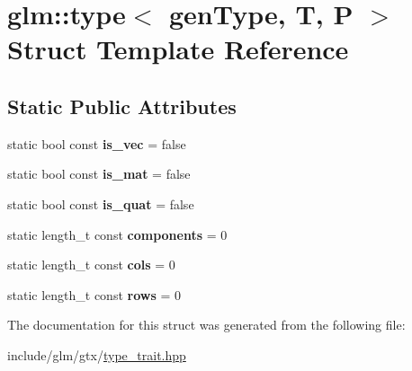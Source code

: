 \hypertarget{structglm_1_1type}{}\section{glm\+:\+:type$<$ gen\+Type, T, P $>$ Struct Template Reference}
\label{structglm_1_1type}
\subsection*{Static Public Attributes}
\begin{DoxyCompactItemize}
\item 
\mbox{\label{structglm_1_1type_a6fdf149b7bcaa9a1d82e29628b7c65ee}} 
static bool const {\bfseries is\+\_\+vec} = false
\item 
\mbox{\label{structglm_1_1type_a26e1d1fef808e586b3ed70c4b182abdf}} 
static bool const {\bfseries is\+\_\+mat} = false
\item 
\mbox{\label{structglm_1_1type_a183d0db2aaef58410b9042663d74e487}} 
static bool const {\bfseries is\+\_\+quat} = false
\item 
\mbox{\label{structglm_1_1type_ab7c161596abb92f6e6c6a19370d81e40}} 
static length\+\_\+t const {\bfseries components} = 0
\item 
\mbox{\label{structglm_1_1type_abe7de2b1bd7b23a03a5da5ef5e66b7f7}} 
static length\+\_\+t const {\bfseries cols} = 0
\item 
\mbox{\label{structglm_1_1type_a8bcdf3e3b3f2f67b70c456a6058fd300}} 
static length\+\_\+t const {\bfseries rows} = 0
\end{DoxyCompactItemize}


The documentation for this struct was generated from the following file\+:\begin{DoxyCompactItemize}
\item 
include/glm/gtx/\hyperlink{type__trait_8hpp}{type\+\_\+trait.\+hpp}\end{DoxyCompactItemize}
